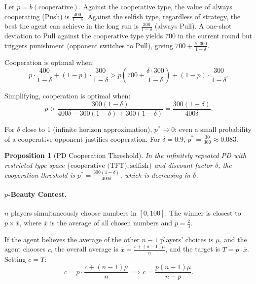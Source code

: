 \documentclass[12pt]{article}
\newtheorem{proposition}{Proposition}
\begin{document}
Let $p = b(\text{cooperative})$. Against the cooperative type, the value of always cooperating (Push) is $\frac{400}{1-\delta}$. Against the selfish type, regardless of strategy, the best the agent can achieve in the long run is $\frac{300}{1-\delta}$ (always Pull). A one-shot deviation to Pull against the cooperative type yields $700$ in the current round but triggers punishment (opponent switches to Pull), giving $700 + \frac{\delta \cdot 300}{1-\delta}$.

Cooperation is optimal when:
\begin{equation}
    p \cdot \frac{400}{1-\delta} + (1-p) \cdot \frac{300}{1-\delta} > p \left(700 + \frac{\delta \cdot 300}{1-\delta}\right) + (1-p) \cdot \frac{300}{1-\delta}.
    \label{eq:pd_threshold}
\end{equation}

Simplifying, cooperation is optimal when:
\begin{equation}
    p > \frac{300(1-\delta)}{400\delta - 300(1-\delta) + 300(1-\delta)} = \frac{300(1-\delta)}{400\delta}.
    \label{eq:pd_threshold_simple}
\end{equation}

For $\delta$ close to 1 (infinite horizon approximation), $p^* \to 0$: even a small probability of a cooperative opponent justifies cooperation. For $\delta = 0.9$, $p^* = \frac{30}{360} \approx 0.083$.

\begin{proposition}[PD Cooperation Threshold]
\label{prop:pd_threshold}
In the infinitely repeated PD with restricted type space $\{\text{cooperative (TFT)}, \text{selfish}\}$ and discount factor $\delta$, the cooperation threshold is $p^* = \frac{300(1-\delta)}{400\delta}$, which is decreasing in $\delta$.
\end{proposition}

\paragraph{$p$-Beauty Contest.}
$n$ players simultaneously choose numbers in $[0, 100]$. The winner is closest to $p \times \bar{x}$, where $\bar{x}$ is the average of all chosen numbers and $p = \frac{2}{3}$.

If the agent believes the average of the other $n-1$ players' choices is $\mu$, and the agent chooses $c$, the overall average is $\bar{x} = \frac{c + (n-1)\mu}{n}$, and the target is $T = p \cdot \bar{x}$. Setting $c = T$:
\begin{equation}
    c = p \cdot \frac{c + (n-1)\mu}{n} \implies c = \frac{p(n-1)\mu}{n - p}.
    \label{eq:bc_best_response}
\end{equation}
\end{document}
